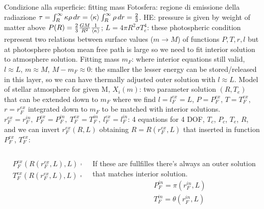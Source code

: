 \begin{frame}{Condizione alla superficie: fitting mass}
    Fotosfera: regione di emissione della radiazione $\tau=\int_R^{\infty}\kappa\rho\,dr=\langle \kappa \rangle\int_R^{\infty}\rho\,dr=\frac{2}{3}$. HE: pressure is given by weight of matter above $P(R)=\frac{2}{3}\frac{GM}{R^2}\frac{1}{\langle \kappa \rangle}$; $L=4\pi R^2\sigma T_e^4$: these photospheric condition represent two relations between surface values ($m\to M$) of functions $P, T, r, l$ but at photosphere photon mean free path is large so we need to fit interior solution to atmosphere solution.
    Fitting mass $m_F$: where interior equations still valid, $l\approx L$, $m\approx M$, $M-m_F\approx 0$: the smaller the lesser energy can be stored/released in this layer, so we can have thermally adjusted outer solution with $l\approx L$.
    Model of stellar atmosphere for given M, $X_i(m)$: two parameter solution $(R,T_e)$ that can be extended down to $m_F$ where we find  $l=l_F^{ex}=L$, $P=P_F^{ex}$, $T=T_F^{ex}$, $r=r_F^{ex}$ integrated down to $m_F$ to be matched with interior solutions.
    $r_F^{ex}=r_F^{in},\ P_F^{ex}=P_F^{in},\ T_F^{ex}=T_F^{in},\ l_F^{ex}=l_F^{in}$: 4 equations for 4 DOF, $T_c$, $P_c$, $T_e$, $R$, and we can invert $r_F^{ex}(R,L)$ obtaining $R=R(r_F^{ex},L)$ that inserted in function $P_F^{ex}$, $T_F^{ex}$:
\begin{columns}[T]
\begin{column}{0.5\textwidth}
\begin{align*} 
&P_F^{ex}(R(r_F^{ex},L),L)=\pi(r_F^{ex},L)\\
&T_F^{ex}(R(r_F^{ex},L),L)=\theta(r_F^{ex},L)
\end{align*}
\end{column}
\begin{column}{0.5\textwidth}
    If these are fullfilles there's always an outer solution that matches interior solution.
\begin{align*}
&P_F^{in}=\pi(r_F^{in},L)\\
&T_F^{in}=\theta(r_F^{in},L)
\end{align*}
\end{column}
\end{columns}

\end{frame}

